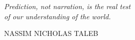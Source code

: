 \clearpage

\thispagestyle{empty}
\null\vfill

\settowidth{}  
\parbox{\longest}{%
  \raggedright{\LARGE\itshape%
   Prediction, not narration, is the real test\\
 of our understanding of the world.\par\bigskip
  }   
  \raggedleft\Large\MakeUppercase{Nassim Nicholas Taleb}\par%
}

\vfill\vfill

\clearpage
\newpage\mbox{}
\thispagestyle{empty}